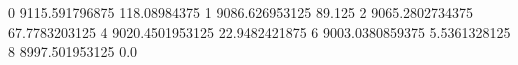0 9115.591796875 118.08984375
1 9086.626953125 89.125
2 9065.2802734375 67.7783203125
4 9020.4501953125 22.9482421875
6 9003.0380859375 5.5361328125
8 8997.501953125 0.0
